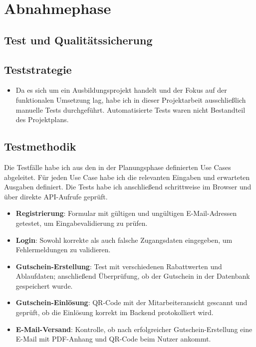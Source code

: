 \section{Abnahmephase}
\label{sec:Abnahmephase}

\subsection{Test und Qualitätssicherung}

\subsection{Teststrategie}
\begin{itemize}
  \item Da es sich um ein Ausbildungsprojekt handelt und der Fokus auf der              funktionalen Umsetzung lag,
        habe ich in dieser Projektarbeit ausschließlich manuelle Tests durchgeführt.
        Automatisierte Tests waren nicht Bestandteil des Projektplans.
\end{itemize}

\subsection{Testmethodik}
\label{sec:Testmethodik}
Die Testfälle habe ich aus den in der Planungsphase definierten Use Cases abgeleitet.
Für jeden Use Case habe ich die relevanten Eingaben und erwarteten Ausgaben definiert.
Die Tests habe ich anschließend schrittweise im Browser und über direkte API-Aufrufe geprüft.

\begin{itemize}
  \item \textbf{Registrierung}: Formular mit gültigen und ungültigen E-Mail-Adressen getestet, um Eingabevalidierung zu prüfen.
  \item \textbf{Login}: Sowohl korrekte als auch falsche Zugangsdaten eingegeben, um Fehlermeldungen zu validieren.
  \item \textbf{Gutschein-Erstellung}: Test mit verschiedenen Rabattwerten und Ablaufdaten; anschließend Überprüfung, ob der Gutschein in der Datenbank gespeichert wurde.
  \item \textbf{Gutschein-Einlösung}: QR-Code mit der Mitarbeiteransicht gescannt und geprüft, ob die Einlösung korrekt im Backend protokolliert wird.
  \item \textbf{E-Mail-Versand}: Kontrolle, ob nach erfolgreicher Gutschein-Erstellung eine E-Mail mit PDF-Anhang und QR-Code beim Nutzer ankommt.
\end{itemize}
\clearpage

